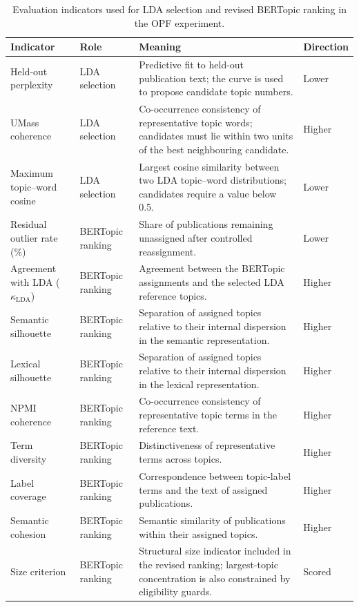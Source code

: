 \documentclass[a4paper,fleqn]{cas-sc}
\begin{document}
    \begin{table}[htbp]
    \centering
    \caption{Evaluation indicators used for LDA selection and revised BERTopic ranking in the OPF experiment.}
    \label{tab:opf_evaluation_metrics}
    \scriptsize
    \setlength{\tabcolsep}{3pt}
    \renewcommand{\arraystretch}{1.15}
    \begin{tabularx}{\textwidth}{p{30mm}p{25mm}X p{16mm}}
    \toprule
    Indicator & Role & Meaning & Direction \\
    \midrule
    Held-out perplexity & LDA selection & Predictive fit to held-out publication text; the curve is used to propose candidate topic numbers. & Lower \\
    UMass coherence & LDA selection & Co-occurrence consistency of representative topic words; candidates must lie within two units of the best neighbouring candidate. & Higher \\
    Maximum topic--word cosine & LDA selection & Largest cosine similarity between two LDA topic--word distributions; candidates require a value below 0.5. & Lower \\
    \midrule
    Residual outlier rate (\%) & BERTopic ranking & Share of publications remaining unassigned after controlled reassignment. & Lower \\
    Agreement with LDA ($\kappa_{\mathrm{LDA}}$) & BERTopic ranking & Agreement between the BERTopic assignments and the selected LDA reference topics. & Higher \\
    Semantic silhouette & BERTopic ranking & Separation of assigned topics relative to their internal dispersion in the semantic representation. & Higher \\
    Lexical silhouette & BERTopic ranking & Separation of assigned topics relative to their internal dispersion in the lexical representation. & Higher \\
    NPMI coherence & BERTopic ranking & Co-occurrence consistency of representative topic terms in the reference text. & Higher \\
    Term diversity & BERTopic ranking & Distinctiveness of representative terms across topics. & Higher \\
    Label coverage & BERTopic ranking & Correspondence between topic-label terms and the text of assigned publications. & Higher \\
    Semantic cohesion & BERTopic ranking & Semantic similarity of publications within their assigned topics. & Higher \\
    Size criterion & BERTopic ranking & Structural size indicator included in the revised ranking; largest-topic concentration is also constrained by eligibility guards. & Scored \\

\end{tabularx}
\end{table}
\end{document}
